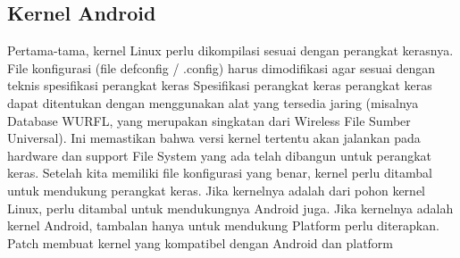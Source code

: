 		\subsection{Kernel Android}
		 Pertama-tama, kernel Linux perlu dikompilasi
		 sesuai dengan perangkat kerasnya. File konfigurasi
		 (file defconfig / .config) harus dimodifikasi agar sesuai dengan teknis
		 spesifikasi perangkat keras Spesifikasi perangkat keras
		 perangkat keras dapat ditentukan dengan menggunakan alat yang tersedia
		 jaring (misalnya Database WURFL, yang merupakan singkatan dari Wireless
		 File Sumber Universal).
		 Ini memastikan bahwa versi kernel tertentu akan
		 jalankan pada hardware dan support File System yang ada
		 telah dibangun untuk perangkat keras.
		 Setelah kita memiliki file konfigurasi yang benar, kernel perlu 
		 ditambal untuk mendukung perangkat keras. Jika kernelnya adalah
		 dari pohon kernel Linux, perlu ditambal untuk mendukungnya
		 Android juga. Jika kernelnya adalah kernel Android, tambalan hanya untuk
		 mendukung Platform perlu diterapkan.
		 Patch membuat kernel yang kompatibel dengan Android dan platform
		 
\cite{engler1995exokernel}
\cite{liedtke1996toward}
\cite{che2006hybrid}
\cite{kashiwagi1996design}
\cite{schmidt2010teaching}
\cite{wang2009usage}
\cite{lee2003firm}

